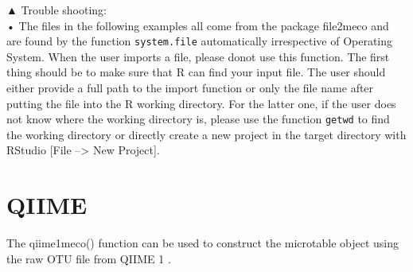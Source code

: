 \documentclass[
]{book}
\begin{document}
▲ Trouble shooting:\\
• The files in the following examples all come from the package file2meco and are found by the function \texttt{system.file} automatically irrespective of Operating System.
When the user imports a file, please donot use this function.
The first thing should be to make sure that R can find your input file.
The user should either provide a full path to the import function or only the file name after putting the file into the R working directory.
For the latter one, if the user does not know where the working directory is,
please use the function \texttt{getwd} to find the working directory or directly create a new project in the target directory with RStudio {[}File --\textgreater{} New Project{]}.

\hypertarget{qiime}{%
\section{QIIME}\label{qiime}}

The qiime1meco() function can be used to construct the microtable object using the raw OTU file from QIIME 1 \citep{Caporaso_QIIME_2010}.
\end{document}
